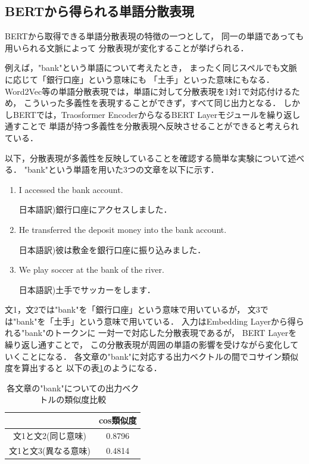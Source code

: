 	\subsection{BERTから得られる単語分散表現}
		BERTから取得できる単語分散表現の特徴の一つとして，
		同一の単語であっても用いられる文脈によって
		分散表現が変化することが挙げられる．

		例えば，"bank"という単語について考えたとき，
		まったく同じスペルでも文脈に応じて「銀行口座」という意味にも
		「土手」といった意味にもなる．
		Word2Vec等の単語分散表現では，単語に対して分散表現を1対1で対応付けるため，
		こういった多義性を表現することができず，すべて同じ出力となる．
		しかしBERTでは，Traosformer EncoderからなるBERT Layerモジュールを繰り返し通すことで
		単語が持つ多義性を分散表現へ反映させることができると考えられている．

		以下，分散表現が多義性を反映していることを確認する簡単な実験\cite{pytorch_advanced}について述べる．
		"bank"という単語を用いた3つの文章を以下に示す．
		\begin{enumerate}
			\item I accessed the bank account.
			\par 日本語訳)銀行口座にアクセスしました．
			\item He transferred the deposit money into the bank account.
			\par 日本語訳)彼は敷金を銀行口座に振り込みました．
			\item We play soccer at the bank of the river.
			\par 日本語訳)土手でサッカーをします．
		\end{enumerate}
		
		文1，文2では"bank"を「銀行口座」という意味で用いているが，
		文3では"bank"を「土手」という意味で用いている．
		入力はEmbedding Layerから得られる"bank"のトークンに
		一対一で対応した分散表現であるが，
		BERT Layerを繰り返し通すことで，
		この分散表現が周囲の単語の影響を受けながら変化していくことになる．
		各文章の"bank"に対応する出力ベクトルの間でコサイン類似度を算出すると
		以下の表\ref{table:bank_compare}のようになる．
		\begin{table}[H]
			\centering
			\caption{各文章の"bank"についての出力ベクトルの類似度比較}
			\label{table:bank_compare}
			\begin{tabular}[H]{|c|c|}
				\hline
				& cos類似度 \\
				\hline
				文1と文2(同じ意味) & 0.8796 \\
				文1と文3(異なる意味) & 0.4814\\
				\hline
			\end{tabular}
		\end{table}
		
